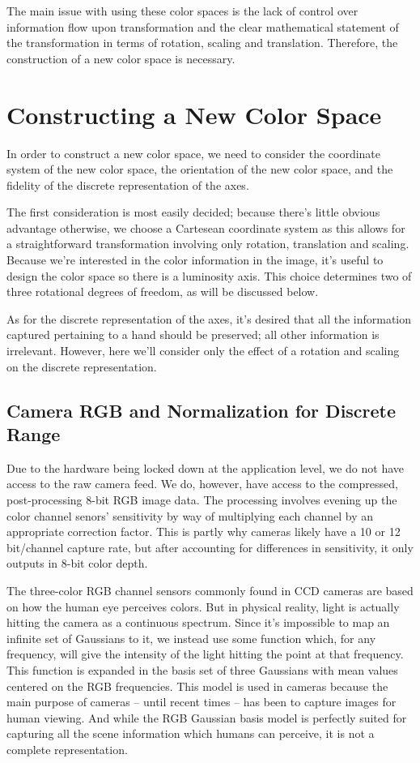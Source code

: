 The main issue with using these color spaces is the lack of control over information flow upon transformation and the clear mathematical statement of the transformation in terms of rotation, scaling and translation. Therefore, the construction of a new color space is necessary.

\section{Constructing a New Color Space}\label{sec:ConstructingANewColorSpace}

In order to construct a new color space, we need to consider the coordinate system of the new color space, the orientation of the new color space, and the fidelity of the discrete representation of the axes.

The first consideration is most easily decided; because there's little obvious advantage otherwise, we choose a Cartesean coordinate system as this allows for a straightforward transformation involving only rotation, translation and scaling. Because we're interested in the color information in the image, it's useful to design the color space so there is a luminosity axis. This choice determines two of three rotational degrees of freedom, as will be discussed below.

As for the discrete representation of the axes, it's desired that all the information captured pertaining to a hand should be preserved; all other information is irrelevant. However, here we'll consider only the effect of a rotation and scaling on the discrete representation.


\subsection{Camera RGB and Normalization for Discrete Range}\label{sec:CameraRGB}

Due to the hardware being locked down at the application level, we do not have access to the raw camera feed. We do, however, have access to the compressed, post-processing 8-bit RGB image data. The processing involves evening up the color channel senors' sensitivity by way of multiplying each channel by an appropriate correction factor. This is partly why cameras likely have a 10 or 12 bit/channel capture rate, but after accounting for differences in sensitivity, it only outputs in 8-bit color depth.

The three-color RGB channel sensors commonly found in CCD cameras are based on how the human eye perceives colors. But in physical reality, light is actually hitting the camera as a continuous spectrum. Since it's impossible to map an infinite set of Gaussians to it, we instead use some function which, for any frequency, will give the intensity of the light hitting the point at that frequency. This function is expanded in the basis set of three Gaussians with mean values centered on the RGB frequencies. This model is used in cameras because the main purpose of cameras -- until recent times -- has been to capture images for human viewing. And while the RGB Gaussian basis model is perfectly suited for capturing all the scene information which humans can perceive, it is not a complete representation.

